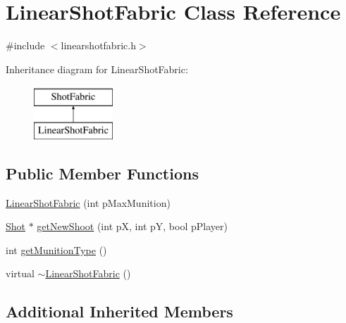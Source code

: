 \hypertarget{class_linear_shot_fabric}{\section{Linear\-Shot\-Fabric Class Reference}
\label{class_linear_shot_fabric}
}


{\ttfamily \#include $<$linearshotfabric.\-h$>$}

Inheritance diagram for Linear\-Shot\-Fabric\-:\begin{figure}[H]
\begin{center}
\leavevmode
\includegraphics[height=2.000000cm]{class_linear_shot_fabric}
\end{center}
\end{figure}
\subsection*{Public Member Functions}
\begin{DoxyCompactItemize}
\item 
\hyperlink{class_linear_shot_fabric_a8e49b3e5c9930d996ceff1544d7deed4}{Linear\-Shot\-Fabric} (int p\-Max\-Munition)
\item 
\hyperlink{class_shot}{Shot} $\ast$ \hyperlink{class_linear_shot_fabric_a62f5fd67da6fa1c985671a122e35f3fd}{get\-New\-Shoot} (int p\-X, int p\-Y, bool p\-Player)
\item 
int \hyperlink{class_linear_shot_fabric_a395b22701c39f96c4ff5ccd038c552d0}{get\-Munition\-Type} ()
\item 
virtual \hyperlink{class_linear_shot_fabric_aca25e114f58a7d61ab38434f7d0f7cbb}{$\sim$\-Linear\-Shot\-Fabric} ()
\end{DoxyCompactItemize}
\subsection*{Additional Inherited Members}


